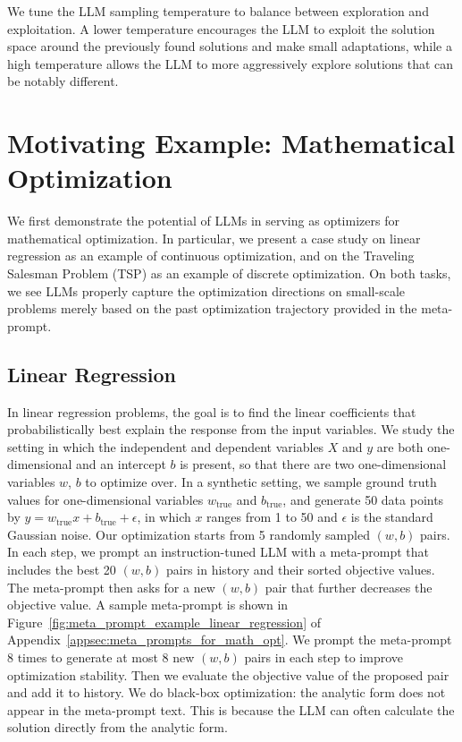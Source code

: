 We tune the LLM sampling temperature to balance between exploration and exploitation. 
A lower temperature encourages the LLM to exploit the solution space around the previously found solutions and make small adaptations, while a high temperature allows the LLM to more aggressively explore solutions that can be notably different.\section{Motivating Example: Mathematical Optimization}
\label{sec:motivating_example}

We first demonstrate the potential of LLMs in serving as optimizers for mathematical optimization. 
In particular, we present a case study on linear regression as an example of continuous optimization, and on the Traveling Salesman Problem (TSP) as an example of discrete optimization. 
On both tasks, we see LLMs properly capture the optimization directions on small-scale problems merely based on the past optimization trajectory provided in the meta-prompt.

\subsection{Linear Regression}

In linear regression problems, the goal is to find the linear coefficients that probabilistically best explain the response from the input variables.
We study the setting in which the independent and dependent variables $X$ and $y$ are both one-dimensional and an intercept $b$ is present, so that there are two one-dimensional variables $w$, $b$ to optimize over.
In a synthetic setting, we sample ground truth values for one-dimensional variables $w_\text{true}$ and $b_\text{true}$, and generate 50 data points by $y = w_\text{true} x + b_\text{true} + \epsilon$, in which $x$ ranges from 1 to 50 and $\epsilon$ is the standard Gaussian noise.
Our optimization starts from 5 randomly sampled $(w, b)$ pairs.
In each step, we prompt an instruction-tuned LLM with a meta-prompt that includes the best 20 $(w, b)$ pairs in history and their sorted objective values.
The meta-prompt then asks for a new $(w, b)$ pair that further decreases the objective value.
A sample meta-prompt is shown in Figure~\ref{fig:meta_prompt_example_linear_regression} of Appendix~\ref{appsec:meta_prompts_for_math_opt}.
We prompt the meta-prompt 8 times to generate at most 8 new $(w, b)$ pairs in each step to improve optimization stability.
Then we evaluate the objective value of the proposed pair and add it to history.
We do black-box optimization: the analytic form does not appear in the meta-prompt text.
This is because the LLM can often calculate the solution directly from the analytic form.

